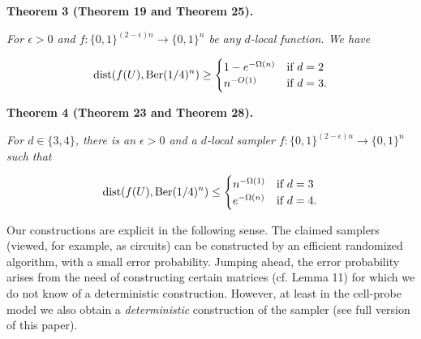 \documentclass[10pt,a4paper]{article}
\begin{document}


\par\medskip\noindent\textbf{
\textbf{Theorem 3}\textbf{ }(Theorem 19 and Theorem 25)\textbf{.}
}\par



\emph{For $\epsilon>0$ and $f\colon\{0,1\}^{(2-\epsilon)n}\to\{0,1\}^{n}$ be any $d$-local function.
We have}\par


\[\begin{gathered}
\mathrm{dist}(f(U),\textnormal{Ber}(1/4)^{n})\geq\begin{cases}1-e^{-\Omega(n)}&\text{if $d=2$}\\
n^{-O(1)}&\text{if $d=3$.}\end{cases}
\end{gathered}\]







\par\medskip\noindent\textbf{
\textbf{Theorem 4}\textbf{ }(Theorem 23 and Theorem 28)\textbf{.}
}\par



\emph{For $d\in\{3,4\}$, there is an $\epsilon>0$ and a $d$-local sampler $f\colon\{0,1\}^{(2-\epsilon)n}\to\{0,1\}^{n}$ such that}\par


\[\begin{gathered}
\mathrm{dist}(f(U),\textnormal{Ber}(1/4)^{n})\leq\begin{cases}n^{-\Omega(1)}&\text{if $d=3$}\\
e^{-\Omega(n)}&\text{if $d=4$.}\end{cases}
\end{gathered}\]






Our constructions are explicit in the following sense. The claimed samplers (viewed, for example, as circuits) can be constructed by an efficient randomized algorithm, with a small error probability.
Jumping ahead, the error probability arises from the need of constructing
certain matrices (cf. Lemma 11) for which we do not know of a deterministic construction. However, at least in the cell-probe model we also obtain a \emph{deterministic} construction of the sampler (see full version of this paper).\par
\end{document}
